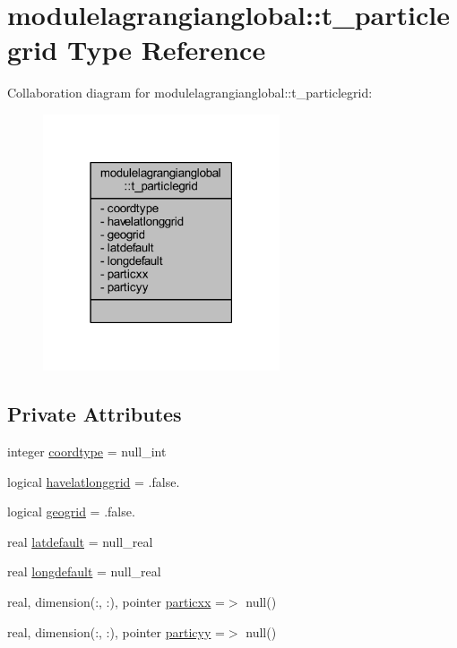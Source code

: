 \hypertarget{structmodulelagrangianglobal_1_1t__particlegrid}{}\section{modulelagrangianglobal\+:\+:t\+\_\+particlegrid Type Reference}
\label{structmodulelagrangianglobal_1_1t__particlegrid}


Collaboration diagram for modulelagrangianglobal\+:\+:t\+\_\+particlegrid\+:\nopagebreak
\begin{figure}[H]
\begin{center}
\leavevmode
\includegraphics[width=198pt]{structmodulelagrangianglobal_1_1t__particlegrid__coll__graph}
\end{center}
\end{figure}
\subsection*{Private Attributes}
\begin{DoxyCompactItemize}
\item 
integer \mbox{\hyperlink{structmodulelagrangianglobal_1_1t__particlegrid_a8b67160ded302ad8b7c9b7a520555a1b}{coordtype}} = null\+\_\+int
\item 
logical \mbox{\hyperlink{structmodulelagrangianglobal_1_1t__particlegrid_a09503b3ed1b8030afe929985799e0781}{havelatlonggrid}} = .false.
\item 
logical \mbox{\hyperlink{structmodulelagrangianglobal_1_1t__particlegrid_a33a9406ca476addb7c36b3f8050873ee}{geogrid}} = .false.
\item 
real \mbox{\hyperlink{structmodulelagrangianglobal_1_1t__particlegrid_a4017d6f16854f1405be7619955024130}{latdefault}} = null\+\_\+real
\item 
real \mbox{\hyperlink{structmodulelagrangianglobal_1_1t__particlegrid_a205eb01e68320158b2d9c30f34819177}{longdefault}} = null\+\_\+real
\item 
real, dimension(\+:, \+:), pointer \mbox{\hyperlink{structmodulelagrangianglobal_1_1t__particlegrid_a2a30046575acd1b6afc4eca68a3edd8a}{particxx}} =$>$ null()
\item 
real, dimension(\+:, \+:), pointer \mbox{\hyperlink{structmodulelagrangianglobal_1_1t__particlegrid_ad8184a9a1cce7616dfe11b9238d6ec87}{particyy}} =$>$ null()
\end{DoxyCompactItemize}



